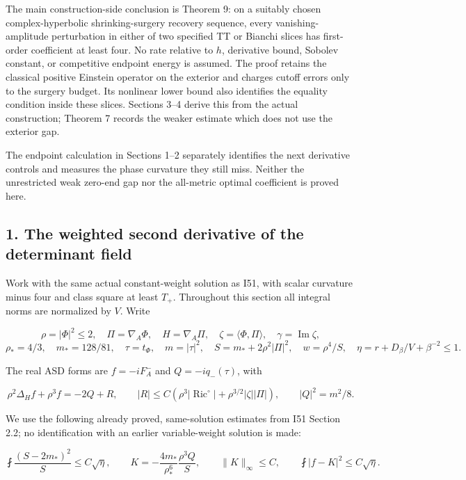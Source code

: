 \documentclass[
  10pt,
]{article}
\begin{document}
The main construction-side conclusion is Theorem 9: on a suitably chosen
complex-hyperbolic shrinking-surgery recovery sequence, every
vanishing-amplitude perturbation in either of two specified TT or
Bianchi slices has first-order coefficient at least four. No rate
relative to \(h\), derivative bound, Sobolev constant, or competitive
endpoint energy is assumed. The proof retains the classical positive
Einstein operator on the exterior and charges cutoff errors only to the
surgery budget. Its nonlinear lower bound also identifies the equality
condition inside these slices. Sections 3--4 derive this from the actual
construction; Theorem 7 records the weaker estimate which does not use
the exterior gap.

The endpoint calculation in Sections 1--2 separately identifies the next
derivative controls and measures the phase curvature they still miss.
Neither the unrestricted weak zero-end gap nor the all-metric optimal
coefficient is proved here.

\hypertarget{the-weighted-second-derivative-of-the-determinant-field}{%
\subsection{1. The weighted second derivative of the determinant
field}\label{the-weighted-second-derivative-of-the-determinant-field}}

Work with the same actual constant-weight solution as I51, with scalar
curvature minus four and class square at least \(T_+\). Throughout this
section all integral norms are normalized by \(V\). Write

\[
 \rho=|\Phi|^2\le2,\quad \Pi=\nabla_A\Phi,\quad H=\nabla_A\Pi,
 \quad \zeta=\langle\Phi,\Pi\rangle,\quad\gamma=\operatorname{Im}\zeta,
\] \[
 \rho_*=4/3,\quad m_*=128/81,\quad
 \tau=t_\Phi,\quad m=|\tau|^2,\quad
 S=m_*+2\rho^2|\Pi|^2,\quad w=\rho^4/S,
 \quad \eta=r+D_\beta/V+\beta^{-2}\le1.
\]

The real ASD forms are \(f=-iF_A^-\) and \(Q=-iq_-(\tau)\), with

\[
 \rho^2\Delta_Hf+\rho^3f=-2Q+R,\qquad
 |R|\le C(\rho^3|\operatorname{Ric}^{\circ}|
                       +\rho^{3/2}|\zeta||\Pi|),\qquad |Q|^2=m^2/8.
 \tag{1.1}
\]

We use the following already proved, same-solution estimates from I51
Section 2.2; no identification with an earlier variable-weight solution
is made:

\[
 \fint\frac{(S-2m_*)^2}{S}\le C\sqrt\eta,\qquad
 K=-\frac{4m_*}{\rho_*^6}\frac{\rho^3Q}{S},\qquad
 \|K\|_\infty\le C,\qquad \fint|f-K|^2\le C\sqrt\eta.
 \tag{1.2}
\]
\end{document}
